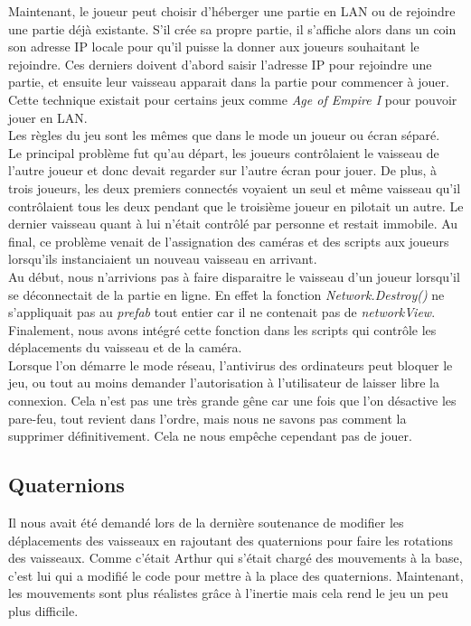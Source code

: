 \documentclass[10pt, titlepage]{report}
\begin{document}
Maintenant, le joueur peut choisir d'héberger une partie en LAN ou de rejoindre une partie déjà existante. S'il crée sa propre partie, il s'affiche alors dans un coin son adresse IP locale pour qu'il puisse la donner aux joueurs souhaitant le rejoindre. Ces derniers doivent d'abord saisir l'adresse IP pour rejoindre une partie, et ensuite leur vaisseau apparait dans la partie pour commencer à jouer. Cette technique existait pour certains jeux comme \textit{Age of Empire I} pour pouvoir jouer en LAN.\\

Les règles du jeu sont les mêmes que dans le mode un joueur ou écran séparé.\\

Le principal problème fut qu'au départ, les joueurs contrôlaient le vaisseau de l'autre joueur et donc devait regarder sur l'autre écran pour jouer. De plus, à trois joueurs, les deux premiers connectés voyaient un seul et même vaisseau qu'il contrôlaient tous les deux pendant que le troisième joueur en pilotait un autre. Le dernier vaisseau quant à lui n'était contrôlé par personne et restait immobile. Au final, ce problème venait de l'assignation des caméras et des scripts aux joueurs lorsqu'ils instanciaient un nouveau vaisseau en arrivant.\\

Au début, nous n'arrivions pas à faire disparaitre le vaisseau d'un joueur lorsqu'il se déconnectait de la partie en ligne. En effet la fonction \textit{Network.Destroy()} ne s'appliquait pas au \textit{prefab} tout entier car il ne contenait pas de \textit{networkView}. Finalement, nous avons intégré cette fonction dans les scripts qui contrôle les déplacements du vaisseau et de la caméra.\\

Lorsque l'on démarre le mode réseau, l'antivirus des ordinateurs peut bloquer le jeu, ou tout au moins demander l'autorisation à l'utilisateur de laisser libre la connexion. Cela n'est pas une très grande gêne car une fois que l'on désactive les pare-feu, tout revient dans l'ordre, mais nous ne savons pas comment la supprimer définitivement. Cela ne nous empêche cependant pas de jouer.\\

\subsection{Quaternions}
Il nous avait été demandé lors de la dernière soutenance de modifier les déplacements des vaisseaux en rajoutant des quaternions pour faire les rotations des vaisseaux. Comme c'était Arthur qui s'était chargé des mouvements à la base, c'est lui qui a modifié le code pour mettre à la place des quaternions. Maintenant, les mouvements sont plus réalistes grâce à l'inertie mais cela rend le jeu un peu plus difficile.\\
\end{document}
